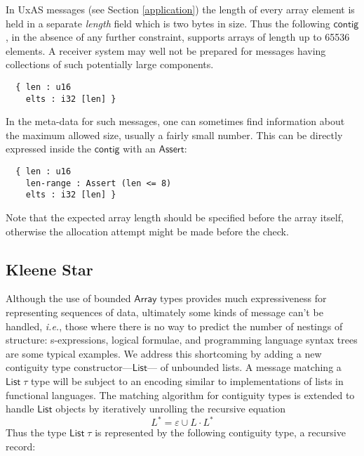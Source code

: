 \documentclass[a4paper,UKenglish,cleveref, autoref, thm-restate]{lipics-v2021}
\newcommand{\ie}{\textit{i.e.}}
\newcommand{\konst}[1]{\ensuremath{\mathsf{#1}}}
\newcommand{\kstar}[1]{\ensuremath{{#1}^{*}}}
\begin{document}
\begin{example}

In UxAS messages (see Section \ref{application}) the length of every
array element is held in a separate \emph{length} field which is two
bytes in size. Thus the following \konst{contig}, in the absence of
any further constraint, supports arrays of length up to 65536
elements. A receiver system may well not be prepared for messages
having collections of such potentially large components.

\begin{verbatim}
  { len : u16
    elts : i32 [len] }
\end{verbatim}

\noindent In the meta-data for such messages, one can sometimes find
information about the maximum allowed size, usually a fairly small
number. This can be directly expressed inside the \konst{contig} with
an \konst{Assert}:

\begin{verbatim}
  { len : u16
    len-range : Assert (len <= 8)
    elts : i32 [len] }
\end{verbatim}

\noindent Note that the expected array length should be specified
before the array itself, otherwise the allocation attempt might be
made before the check.
\end{example}

\subsection{Kleene Star}\label{list-type}

Although the use of bounded \konst{Array} types provides much
expressiveness for representing sequences of data, ultimately some
kinds of message can't be handled, \ie, those where there is no way to
predict the number of nestings of structure: s-expressions, logical
formulae, and programming language syntax trees are some typical
examples. We address this shortcoming by adding a new contiguity type
constructor---\konst{List}--- of unbounded lists. A message matching a
$\konst{List}\;\tau$ type will be subject to an encoding similar to
implementations of lists in functional languages. The matching
algorithm for contiguity types is extended to handle \konst{List}
objects by iteratively unrolling the recursive equation
%
\[ \kstar{L} = \varepsilon \cup L \cdot \kstar{L} \]
%
Thus the type $\konst{List}\;\tau$ is represented by the following
contiguity type, a recursive record:
\end{document}
